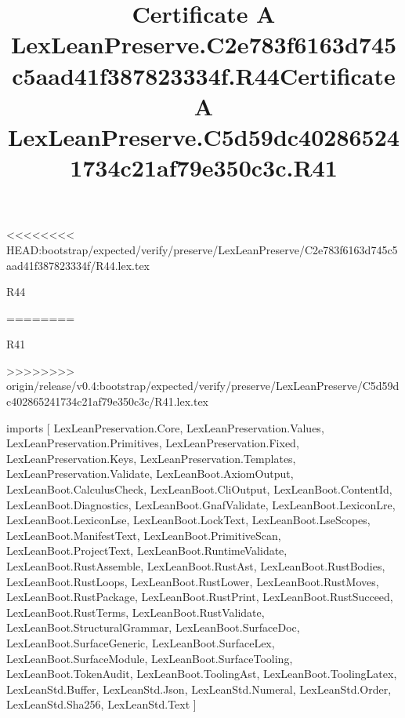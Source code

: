<<<<<<<< HEAD:bootstrap/expected/verify/preserve/LexLeanPreserve/C2e783f6163d745c5aad41f387823334f/R44.lex.tex
\begin{lexlean}{R44}
\title{Certificate A LexLeanPreserve.C2e783f6163d745c5aad41f387823334f.R44}
========
\begin{lexlean}{R41}
\title{Certificate A LexLeanPreserve.C5d59dc402865241734c21af79e350c3c.R41}
>>>>>>>> origin/release/v0.4:bootstrap/expected/verify/preserve/LexLeanPreserve/C5d59dc402865241734c21af79e350c3c/R41.lex.tex
\begin{coremodule}
imports [
  LexLeanPreservation.Core,
  LexLeanPreservation.Values,
  LexLeanPreservation.Primitives,
  LexLeanPreservation.Fixed,
  LexLeanPreservation.Keys,
  LexLeanPreservation.Templates,
  LexLeanPreservation.Validate,
  LexLeanBoot.AxiomOutput,
  LexLeanBoot.CalculusCheck,
  LexLeanBoot.CliOutput,
  LexLeanBoot.ContentId,
  LexLeanBoot.Diagnostics,
  LexLeanBoot.GnafValidate,
  LexLeanBoot.LexiconLre,
  LexLeanBoot.LexiconLse,
  LexLeanBoot.LockText,
  LexLeanBoot.LseScopes,
  LexLeanBoot.ManifestText,
  LexLeanBoot.PrimitiveScan,
  LexLeanBoot.ProjectText,
  LexLeanBoot.RuntimeValidate,
  LexLeanBoot.RustAssemble,
  LexLeanBoot.RustAst,
  LexLeanBoot.RustBodies,
  LexLeanBoot.RustLoops,
  LexLeanBoot.RustLower,
  LexLeanBoot.RustMoves,
  LexLeanBoot.RustPackage,
  LexLeanBoot.RustPrint,
  LexLeanBoot.RustSucceed,
  LexLeanBoot.RustTerms,
  LexLeanBoot.RustValidate,
  LexLeanBoot.StructuralGrammar,
  LexLeanBoot.SurfaceDoc,
  LexLeanBoot.SurfaceGeneric,
  LexLeanBoot.SurfaceLex,
  LexLeanBoot.SurfaceModule,
  LexLeanBoot.SurfaceTooling,
  LexLeanBoot.TokenAudit,
  LexLeanBoot.ToolingAst,
  LexLeanBoot.ToolingLatex,
  LexLeanStd.Buffer,
  LexLeanStd.Json,
  LexLeanStd.Numeral,
  LexLeanStd.Order,
  LexLeanStd.Sha256,
  LexLeanStd.Text
]


\end{coremodule}
\end{lexlean}
\end{lexlean}
